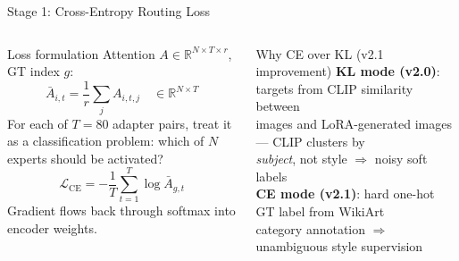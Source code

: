 \documentclass[aspectratio=169,10pt]{beamer}
\newcommand{\RR}{\mathbb{R}}
\begin{document}
\begin{frame}[shrink=20]{Stage 1: Cross-Entropy Routing Loss}
  \begin{columns}[T]
      \begin{block}{Loss formulation}
        Attention $A \in \RR^{N \times T \times r}$, GT index $g$:
        \[
          \bar{A}_{i,t} = \frac{1}{r}\sum_j A_{i,t,j} \quad \in \RR^{N\times T}
        \]
        For each of $T=80$ adapter pairs, treat it as a classification
        problem: which of $N$ experts should be activated?
        \[
          \mathcal{L}_\text{CE} = -\frac{1}{T}\sum_{t=1}^T \log \bar{A}_{g,t}
        \]
        Gradient flows back through softmax into encoder weights.
      \end{block}
      \begin{alertblock}{Why CE over KL (v2.1 improvement)}
        \footnotesize
        \textbf{KL mode (v2.0)}: targets from CLIP similarity between\\
        images and LoRA-generated images — CLIP clusters by\\
        \emph{subject}, not style $\Rightarrow$ noisy soft labels\\[0.3em]
        \textbf{CE mode (v2.1)}: hard one-hot GT label from WikiArt\\
        category annotation $\Rightarrow$ unambiguous style supervision
      \end{alertblock}


\end{columns}
\end{frame}
\end{document}
